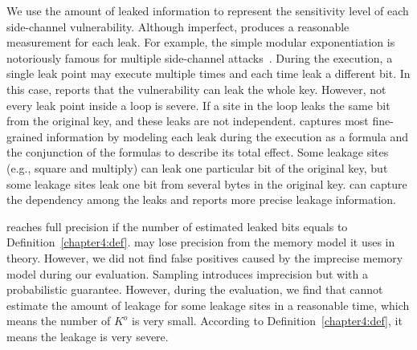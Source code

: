 We use the amount of leaked information to represent the sensitivity level of
each side-channel vulnerability. Although imperfect, \tool{} produces a reasonable
measurement for each leak. For example, the simple modular exponentiation is
notoriously famous for multiple side-channel attacks~\cite{kocher1996timing}.
During the execution, a single leak point may execute multiple times
and each time leak a different bit. In this case, \tool{} reports that the
vulnerability can leak the whole key. However, not every leak point inside a
loop is severe. If a site in the loop leaks the same bit from the
original key, and these leaks are not independent. \tool{} captures most
fine-grained information by modeling each leak during the execution as a
formula and the conjunction of the formulas to describe its total effect.
Some leakage sites (e.g., square and multiply)
can leak one particular bit of the original key, but some leakage sites leak one bit
from several bytes in the original key. \tool{} can capture the dependency among the leaks and
reports more precise leakage information.

\tool{} reaches full precision if the number of estimated leaked bits
equals to Definition~\ref{chapter4:def}.
\tool{} may lose precision from the
memory model it uses in theory. However, we did not find false positives
caused by the imprecise memory model during our evaluation.
Sampling introduces imprecision but with a probabilistic guarantee.
However, during the evaluation, we find that \tool{} cannot estimate
the amount of leakage for some leakage sites in a reasonable time,
which means the number of $K^o$ is very small. According to Definition~\ref{chapter4:def}, it means the leakage is very severe. 
